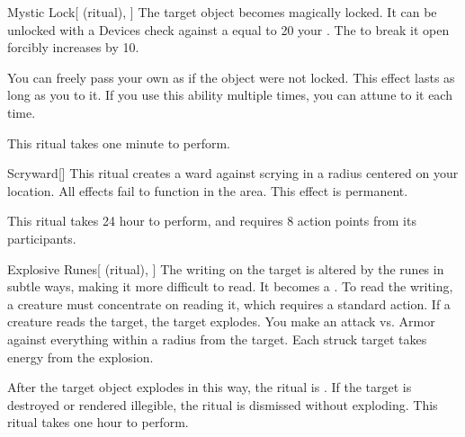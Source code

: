 \lowercase{\hypertarget{spell:Mystic Lock}{}}\label{spell:Mystic Lock}
\begin{attuneability}[Rank 3]{\hypertarget{spell:Mystic Lock}{Mystic Lock}}[ (ritual), ]
The target object becomes magically locked.
It can be unlocked with a Devices check against a  equal to 20 \add your .
The  to break it open forcibly increases by 10.

You can freely pass your own  as if the object were not locked.
This effect lasts as long as you  to it.
If you use this ability multiple times, you can attune to it each time.

This ritual takes one minute to perform.
\end{attuneability}
\vspace{0.25em}



\lowercase{\hypertarget{spell:Scryward}{}}\label{spell:Scryward}
\begin{apability}[Rank 3]{\hypertarget{spell:Scryward}{Scryward}}[]
\targetrule
This ritual creates a ward against scrying in a \arealarge radius  centered on your location.
All  effects fail to function in the area.
This effect is permanent.

This ritual takes 24 hour to perform, and requires 8 action points from its participants.
\end{apability}
\vspace{0.25em}



\lowercase{\hypertarget{spell:Explosive Runes}{}}\label{spell:Explosive Runes}
\begin{attuneability}[Rank 4]{\hypertarget{spell:Explosive Runes}{Explosive Runes}}[ (ritual), ]
The writing on the target is altered by the runes in subtle ways, making it more difficult to read.
It becomes a .
To read the writing, a creature must concentrate on reading it, which requires a standard action.
If a creature reads the target, the target explodes.
You make an attack vs. Armor against everything within a \areamed radius from the target.
Each struck target takes energy  from the explosion.

After the target object explodes in this way, the ritual is .
If the target is destroyed or rendered illegible, the ritual is dismissed without exploding.
This ritual takes one hour to perform.
\end{attuneability}
\vspace{0.25em}



